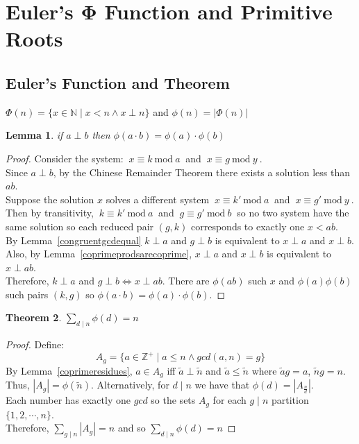 \documentclass[12pt]{extarticle}
\renewcommand\qedsymbol{$\square$}
\newcommand{\divides}{\mid}
\newcommand{\N}{\mathbb{N}}
\newcommand{\Zplus}{\mathbb{Z}^{+}}
\newtheorem{theorem}{Theorem}[section]
\newtheorem{lemma}[theorem]{Lemma}
\newenvironment{definition}[1][Definition:]{\begin{trivlist}
\item[\hskip \labelsep {\bfseries #1}]}{\end{trivlist}}
\newenvironment{lproof}{\begin{proof} \renewcommand{\qedsymbol}{}}{\end{proof}}
\renewcommand{\mod}[3]{\: #1 \equiv #2 \: \mathrm{mod} \: #3 \:}
\begin{document}
\section{Euler's $\mathbf{\Phi}$ Function and Primitive Roots}

\subsection{Euler's Function and Theorem}

\begin{definition}
$\Phi (n) = \{x \in \N \mid x < n \wedge x \perp n \}$ and $\phi (n) = | \Phi (n) |$
\end{definition}

\begin{lemma}
\label{coprimephimuliplicative}
if $a \perp b$ then $\phi (a \cdot b) = \phi (a) \cdot \phi (b)$
\end{lemma}

\begin{lproof}
Consider the system: $\mod{x}{k}{a}$ and $\mod{x}{g}{y}$. \\ Since $a \perp b$, by the Chinese Remainder Theorem there exists a solution less than $ab$. \\ Suppose the solution $x$ solves a different system $\mod{x}{k'}{a}$ and $\mod{x}{g'}{y}$.\\Then by transitivity, $\mod{k}{k'}{a}$ and $\mod{g}{g'}{b}$ so no two system have the same solution so each reduced pair $(g,k)$ corresponds to exactly one $x < ab$. \\ By Lemma~\ref{congruentgcdequal} $k \perp a$ and $g \perp b$ is equivalent to $x \perp a$ and $x \perp b$. \\ Also, by Lemma~\ref{coprimeprodsarecoprime}, $x \perp a$ and $x \perp b$ is equivalent to $x \perp ab$. \\ Therefore, $k \perp a$ and $g \perp b\iff x \perp ab$. There are $\phi (ab)$ such $x$ and $\phi (a) \phi(b)$ such pairs $(k,g)$ so $\phi (a \cdot b) = \phi (a) \cdot \phi (b)$. 
\end{lproof}

\begin{theorem}
\label{phisumoffactors}
$\sum \limits_{d \divides n} \phi (d) = n$
\end{theorem}

\begin{proof}
Define: \[A_g = \{a \in \Zplus \mid a \le n \wedge gcd(a,n) = g \} \] By Lemma~\ref{coprimeresidues}, $a \in A_g$ iff $\tilde{a} \perp \tilde{n}$ and $\tilde{a} \le \tilde{n}$ where $\tilde{a}g = a$, $\tilde{n}g = n$.\\ Thus, $|A_g| = \phi (\tilde{n})$. Alternatively, for $d \divides n$ we have that $\phi (d) = |A_{\frac{n}{d}}|$. \\ Each number has exactly one $gcd$ so the sets $A_g$ for each $g \divides n$ partition $\{1,2, \cdots , n\}$. \\ Therefore, $\sum \limits_{g \divides n} |A_g| = n$ and so $\sum \limits_{d \divides n} \phi (d) = n$
\end{proof}
\end{document}
